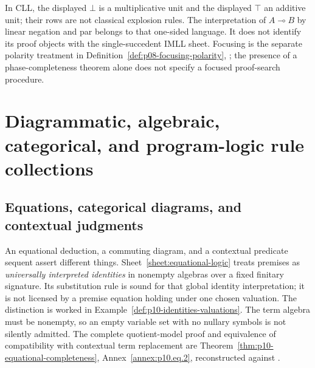 In CLL, the displayed \(\bot\) is a multiplicative unit and the displayed
\(\top\) an additive unit; their rows are not classical explosion rules.
The interpretation of \(A\multimap B\) by linear negation and par belongs
to that one-sided language.  It does not identify its proof objects with the
single-succedent IMLL sheet.  Focusing is the separate polarity treatment in
Definition~\ref{def:p08-focusing-polarity}, \cite{Andreoli1992}; the presence
of a phase-completeness theorem alone does not specify a focused proof-search
procedure.


\section{Diagrammatic, algebraic, categorical, and program-logic rule collections}
\label{sec:p14-nonclassical-specialized}

\subsection{Equations, categorical diagrams, and contextual judgments}

An equational deduction, a commuting diagram, and a contextual predicate
sequent assert different things.  Sheet~\ref{sheet:equational-logic} treats
premises as \emph{universally interpreted identities} in nonempty algebras
over a fixed finitary signature.  Its substitution rule is sound for that
global identity interpretation; it is not licensed by a premise equation
holding under one chosen valuation.  The distinction is worked in
Example~\ref{def:p10-identities-valuations}.  The term algebra must be
nonempty, so an empty variable set with no nullary symbols is not silently
admitted.  The complete quotient-model proof and equivalence of compatibility
with contextual term replacement are
Theorem~\ref{thm:p10-equational-completeness},
Annex~\ref{annex:p10.eq.2}, reconstructed against
\cite[II\S14]{BurrisSankappanavar2012}.

